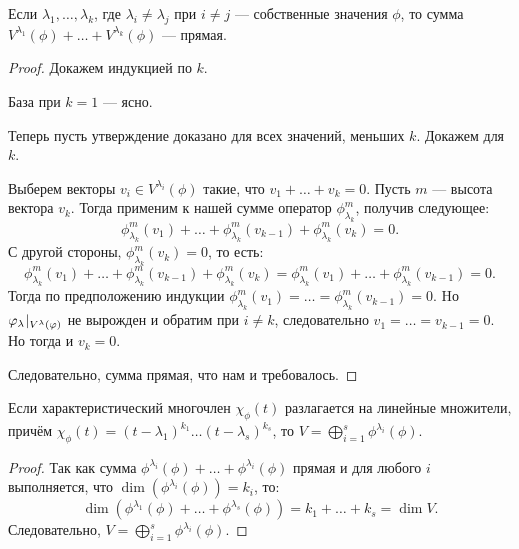 \begin{Suggestion}
	Если $\lambda_1, \ldots, \lambda_k$, где $\lambda_i \neq \lambda_j$ при $i \neq j$ --- собственные значения $\phi$, то сумма $V^{\lambda_1}(\phi) + \ldots + V^{\lambda_k}(\phi)$ --- прямая.
\end{Suggestion}

\begin{proof}
	Докажем индукцией по $k$.
	
	База при $k = 1$ --- ясно.
	
	Теперь пусть утверждение доказано для всех значений, меньших $k$. Докажем для $k$.
	
	Выберем векторы $v_i \in V^{\lambda_i}(\phi)$ такие, что $v_1 + \ldots + v_k = 0$. Пусть $m$ --- высота вектора $v_k$. Тогда применим к нашей сумме оператор $\phi^m_{\lambda_k}$, получив следующее:
	\[
	\phi^m_{\lambda_k}(v_1) + \ldots + \phi^m_{\lambda_k}(v_{k-1}) + \phi^m_{\lambda_k}(v_k) = 0.
	\]
	С другой стороны, $ \phi^m_{\lambda_k}(v_k) = 0$, то есть:
	\[
	\phi^m_{\lambda_k}(v_1) + \ldots + \phi^m_{\lambda_k}(v_{k-1}) + \phi^m_{\lambda_k}(v_k) = \phi^m_{\lambda_k}(v_1) + \ldots + \phi^m_{\lambda_k}(v_{k-1}) = 0.
	\]
	Тогда по предположению индукции $\phi^m_{\lambda_k}(v_1) = \ldots = \phi^m_{\lambda_k}(v_{k-1}) = 0$. Hо
	$ {\varphi_\lambda}\negmedspace\mid_{V^\lambda(\varphi)}$ не вырожден и обратим при $i \neq k$, следовательно $v_1 = \ldots = v_{k-1} = 0$. Но тогда и $v_k = 0$. 
	
	Следовательно, сумма прямая, что нам и требовалось.
\end{proof}

\begin{Theorem}
	Если характеристический многочлен $\chi_\phi(t)$ разлагается на линейные множители, причём $\chi_\phi(t) = (t - \lambda_1)^{k_1}\ldots(t - \lambda_s)^{k_s}$, то $V = \bigoplus_{i = 1}^s  \phi^{\lambda_i}(\phi)$.
\end{Theorem}

\begin{proof}
	Так как сумма $ \phi^{\lambda_i}(\phi) + \ldots +  \phi^{\lambda_i}(\phi)$ прямая и для любого $i$ выполняется, что $\dim(\phi^{\lambda_i}(\phi)) = k_i$, то: 
	$$
	\dim(\phi^{\lambda_1}(\phi) + \ldots +  \phi^{\lambda_s}(\phi)) = k_1 + \ldots + k_s = \dim{V}.
	$$
	Следовательно, $V = \bigoplus_{i = 1}^s  \phi^{\lambda_i}(\phi)$.
\end{proof}

